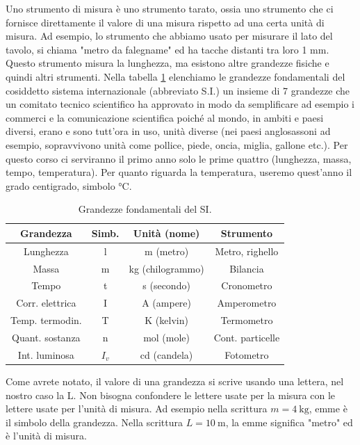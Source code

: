 Uno strumento di misura è uno strumento tarato, ossia uno strumento che ci fornisce direttamente  il valore di  una misura rispetto ad una certa unità di misura. Ad esempio, lo strumento che abbiamo usato per misurare il lato del tavolo, si chiama "metro da falegname" ed ha tacche distanti tra loro 1 mm. Questo strumento misura la lunghezza, ma esistono altre grandezze fisiche e quindi altri strumenti. Nella tabella \ref{tab:si_units} elenchiamo le grandezze fondamentali del cosiddetto sistema internazionale (abbreviato S.I.) un insieme di 7 grandezze che un comitato tecnico scientifico ha approvato in modo da semplificare ad esempio i commerci e la comunicazione scientifica poiché al mondo, in ambiti e paesi diversi, erano e sono tutt'ora in uso, unità diverse (nei paesi anglosassoni ad esempio, sopravvivono unità come pollice, piede, oncia, miglia, gallone etc.). Per questo corso ci serviranno il primo anno solo le prime quattro (lunghezza, massa, tempo, temperatura). Per quanto riguarda la temperatura, useremo quest'anno il grado centigrado, simbolo °C. 

\begin{table}[h!]
	\centering
	\begin{tabular}{|c|c|c|c|}
		\hline
		\textbf{Grandezza} & \textbf{Simb.} & \textbf{Unità (nome)} & \textbf{Strumento} \\
		\hline
		Lunghezza & l & m (metro) & Metro, righello \\
		\hline
		Massa & m & kg (chilogrammo) & Bilancia \\
		\hline
		Tempo & t & s (secondo) & Cronometro \\
		\hline
		Corr. elettrica & I & A (ampere) & Amperometro \\
		\hline
		Temp. termodin. & T & K (kelvin) & Termometro \\
		\hline
		Quant. sostanza & n & mol (mole) & Cont. particelle \\
		\hline
		Int. luminosa & $I_v$ & cd (candela) & Fotometro \\
		\hline
	\end{tabular}
	\caption{Grandezze fondamentali del SI.}
	\label{tab:si_units}
\end{table}

Come avrete notato, il valore di una grandezza si scrive usando una lettera, nel nostro caso la L. Non bisogna confondere le lettere usate per la misura con le lettere usate per l'unità di misura. Ad esempio nella scrittura $m=\SI{4}{\kilo\gram}$, emme è il simbolo della grandezza. Nella scrittura $L=\SI{10}{\meter}$, la emme significa "metro" ed è l'unità di misura.

